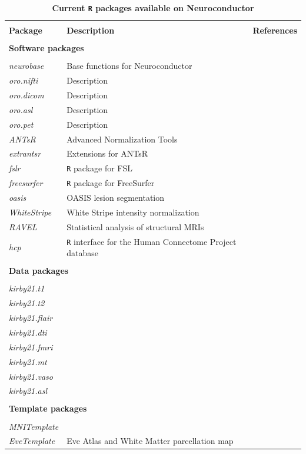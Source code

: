 \documentclass[]{elsarticle} %
\newcommand{\pkg}[1]{\emph{#1}}
\newcommand{\rlang}{\texttt{R}}
\begin{document}
\begin{table}[!ht]
\centering
\caption{\textbf{Current {\rlang} packages available on Neuroconductor}}\label{tab:packages}
\begin{tabular}{lll}
\hline \\[-2ex]
\textbf{Package} & \textbf{Description}   & \textbf{References} \\
\hline \\ [-1.5ex]
\multicolumn{3}{l}{\textbf{Software packages}}\\
\\ [-1.5ex]
\pkg{neurobase} & Base functions for Neuroconductor  &   \\
\pkg{oro.nifti} & Description  &  \citep{oro.nifti} \\
\pkg{oro.dicom} & Description  &  \citep{oro.nifti} \\
\pkg{oro.asl} & Description  &   \\
\pkg{oro.pet} & Description  &   \\
\pkg{ANTsR} & Advanced Normalization Tools  & \citep{ants} \\
\pkg{extrantsr} & Extensions for ANTsR  &  \\
\pkg{fslr} & {\rlang} package for FSL  & \citep{fslr,fsl} \\
\pkg{freesurfer} & {\rlang} package for FreeSurfer  & \citep{freesurfer} \\
\pkg{oasis} & OASIS lesion segmentation & \citep{oasis}\\
\pkg{WhiteStripe} & White Stripe intensity normalization  & \citep{whitestripe} \\
\pkg{RAVEL} & Statistical analysis of structural MRIs  & \citep{ravel} \\
\pkg{hcp} & {\rlang} interface for the Human Connectome Project database &  \\
\hline \\ [-1.5ex]
\multicolumn{3}{l}{\textbf{Data packages}}\\
\\ [-1.5ex]
\pkg{kirby21.t1} &   & \citep{kirby}  \\
\pkg{kirby21.t2} &   &  \citep{kirby} \\
\pkg{kirby21.flair} &   &  \citep{kirby} \\
\pkg{kirby21.dti} &   &  \citep{kirby} \\
\pkg{kirby21.fmri} &   &  \citep{kirby} \\
\pkg{kirby21.mt} &   &  \citep{kirby} \\
\pkg{kirby21.vaso} &   &  \citep{kirby} \\
\pkg{kirby21.asl} &   &  \citep{kirby} \\
\hline \\ [-1.5ex]
\multicolumn{3}{l}{\textbf{Template packages}}\\
\\ [-1.5ex]
\pkg{MNITemplate} &   &   \\
\pkg{EveTemplate} & Eve Atlas and White Matter parcellation map  & \citep{eve}  \\
\end{tabular}
\end{table}
\end{document}

